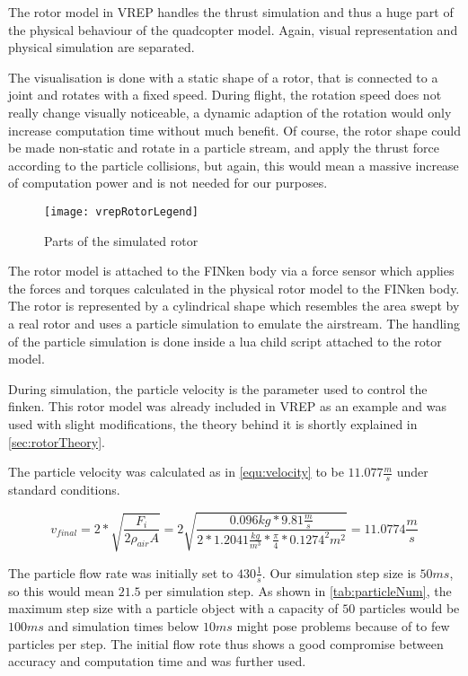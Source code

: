 The rotor model in VREP handles the thrust simulation and thus a huge part of the physical behaviour of the quadcopter model.  
Again, visual representation and physical simulation are separated. 

The visualisation is done with a static shape of a rotor, that is connected to a joint and rotates with a fixed speed. 
During flight, the rotation speed does not really change visually noticeable, a dynamic adaption of the rotation would only increase computation time without much benefit. 
Of course, the rotor shape could be made non-static and rotate in a particle stream, and apply the thrust force according to the particle collisions, but again, this would mean a massive increase of computation power and is not needed for our purposes.

\begin{figure}[h!]
 \begin{center}
  \texttt{[image: vrepRotorLegend]}
 \end{center}
  \caption{Parts of the simulated rotor \label{fig:vrepRotor}}
\end{figure}


The rotor model is attached to the FINken body via a force sensor which applies the forces and torques calculated in the physical rotor model to the FINken body. 
The rotor is represented by a cylindrical shape which resembles the area swept by a real rotor and uses a particle simulation to emulate the airstream. The handling of the particle simulation is done inside a lua child script attached to the rotor model.
 
 
During simulation, the particle velocity is the parameter used to control the finken. This rotor model was already included in VREP as an example and was used with slight  modifications, the theory behind it is shortly explained in \ref{sec:rotorTheory}. 

The particle velocity was calculated as in \ref{equ:velocity} to be $11.077 \frac{m}{s}$ under standard conditions.

 \begin{equation}
    v_{final}= 2 * \sqrt{\frac{ F_i}{2 \rho_{air} A}} = 2 \sqrt{\frac{ 0.096 kg * 9.81 \frac{m}{s}}{2 * 1.2041 \frac{kg}{m^3} * \frac{\pi}{4} * 0.1274^2 m^2}} = 11.0774 \frac{m}{s}
    \label{equ:velocity}
 \end{equation}
 
 
    
    The particle flow rate was initially set to $430 \frac{1}{s}$. 
    Our simulation step size is $50 ms$, so this would mean $21.5$ per simulation step. 
    As shown in \ref{tab:particleNum}, the maximum step size with a particle object with a capacity of $50$ particles would be $100 ms$ and simulation times below $10 ms$ might pose problems because of to few particles per step. 
   The initial flow rote thus shows a good compromise between accuracy and computation time and was further used.
    
